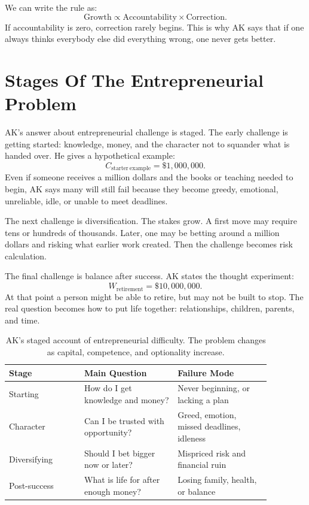 We can write the rule as:
\begin{equation}
\mathrm{Growth}
\propto
\mathrm{Accountability}
\times
\mathrm{Correction}.
\end{equation}
If accountability is zero, correction rarely begins. This is why AK says that if one always thinks everybody else did everything wrong, one never gets better.

\section{Stages Of The Entrepreneurial Problem}

AK's answer about entrepreneurial challenge is staged. The early challenge is getting started: knowledge, money, and the character not to squander what is handed over. He gives a hypothetical example:
\begin{equation}
C_{\mathrm{starter\ example}}=\$1{,}000{,}000.
\end{equation}
Even if someone receives a million dollars and the books or teaching needed to begin, AK says many will still fail because they become greedy, emotional, unreliable, idle, or unable to meet deadlines.

The next challenge is diversification. The stakes grow. A first move may require tens or hundreds of thousands. Later, one may be betting around a million dollars and risking what earlier work created. Then the challenge becomes risk calculation.

The final challenge is balance after success. AK states the thought experiment:
\begin{equation}
W_{\mathrm{retirement}}=\$10{,}000{,}000.
\end{equation}
At that point a person might be able to retire, but may not be built to stop. The real question becomes how to put life together: relationships, children, parents, and time.

\begin{table}
\centering
\begin{tabular}{|p{0.25\linewidth}|p{0.31\linewidth}|p{0.31\linewidth}|}
\hline
Stage & Main Question & Failure Mode \\
\hline
Starting & How do I get knowledge and money? & Never beginning, or lacking a plan \\
\hline
Character & Can I be trusted with opportunity? & Greed, emotion, missed deadlines, idleness \\
\hline
Diversifying & Should I bet bigger now or later? & Mispriced risk and financial ruin \\
\hline
Post-success & What is life for after enough money? & Losing family, health, or balance \\
\hline
\end{tabular}
\caption{AK's staged account of entrepreneurial difficulty. The problem changes as capital, competence, and optionality increase.}
\end{table}

